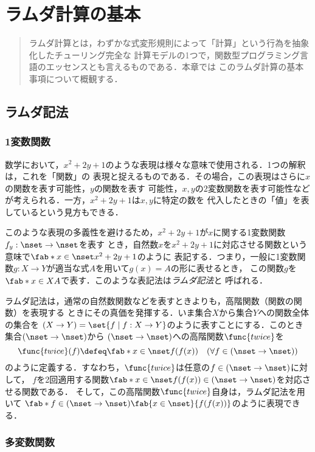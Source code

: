 \documentclass[uplatex,dvipdfmx,report,fleqn]{jsbook}
\begin{document}
\chapter{ラムダ計算の基本}

\begin{abstract}
ラムダ計算とは，わずかな式変形規則によって「計算」という行為を抽象化したチューリング完全な
計算モデルの1つで，関数型プログラミング言語のエッセンスとも言えるものである．本章では
このラムダ計算の基本事項について概観する．
\end{abstract}

\section{ラムダ記法}

\subsection{1変数関数}

数学において，$x^2+2y+1$のような表現は様々な意味で使用される．1つの解釈は，これを「関数」の
表現と捉えるものである．その場合，この表現はさらに$x$の関数を表す可能性，$y$の関数を表す
可能性，$x,y$の2変数関数を表す可能性などが考えられる．一方，$x^2+2y+1$は$x,y$に特定の数を
代入したときの「値」を表しているという見方もできる．

このような表現の多義性を避けるため，$x^2+2y+1$が$x$に関する1変数関数$f_y:\nset\to\nset$を表す
とき，自然数$x$を$x^2+2y+1$に対応させる関数という意味で$\fab*{x\in\nset}{x^2+2y+1}$のように
表記する．つまり，一般に1変数関数$g:X\to Y$が適当な式$A$を用いて$g(x)=A$の形に表せるとき，
この関数$g$を$\fab*{x\in X}{A}$で表す．このような表記法は\emph{ラムダ記法}と
呼ばれる．

ラムダ記法は，通常の自然数関数などを表すときよりも，高階関数（関数の関数）を表現する
ときにその真価を発揮する．いま集合$X$から集合$Y$への関数全体の集合を
$(X\to Y)=\set{f\mid f:X\to Y}$のように表すことにする．このとき集合$(\nset\to\nset)$から
$(\nset\to\nset)$への高階関数$\func{twice}$を
\[
\func{twice}(f) \defeq \fab*{x\in\nset}{f(f(x))} \quad (\forall f\in(\nset\to\nset))
\]
のように定義する．すなわち，$\func{twice}$は任意の$f\in(\nset\to\nset)$に対して，
$f$を2回適用する関数$\fab*{x\in\nset}{f(f(x))}\in(\nset\to\nset)$を対応させる関数である．
そして，この高階関数$\func{twice}$自身は，ラムダ記法を用いて
$\fab*{f\in(\nset\to\nset)}{\fab{x\in\nset}{f(f(x))}}$のように表現できる．

\subsection{多変数関数}
\end{document}
